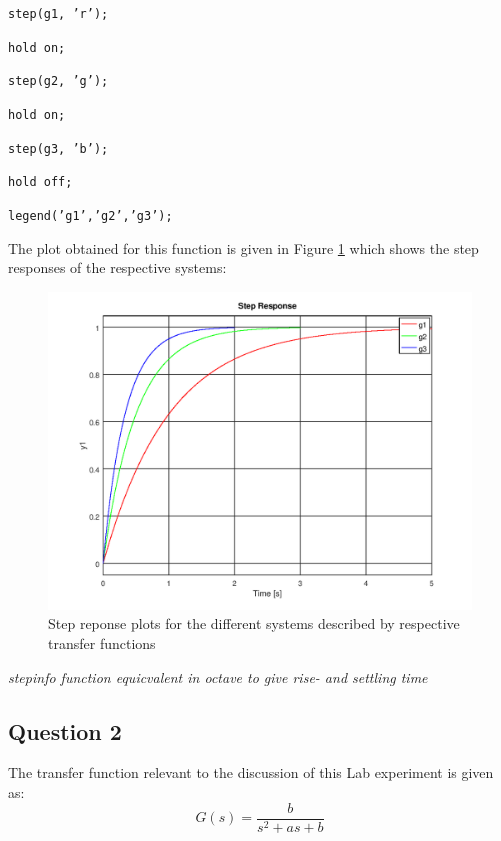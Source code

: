 \documentclass[a4paper, 12pt]{article}
\begin{document}
		\texttt{step(g1, 'r');}\par
		\texttt{hold on;}\par
		\texttt{step(g2, 'g');}\par
		\texttt{hold on;}\par
		\texttt{step(g3, 'b');}\par
		\texttt{hold off;}\par

		\texttt{legend('g1','g2','g3');}\par

		The plot obtained for this function is given in Figure \ref{fig:plot_question_1_lab} which shows the step responses of the respective systems:

		\begin{figure}[H]
			\centering
			\includegraphics[width = 150mm]{img/Question_1_Lab_Plots.png}
			\caption{Step reponse plots for the different systems described by respective transfer functions}
			\label{fig:plot_question_1_lab}
		\end{figure}

		\textit{stepinfo function equicvalent in octave to give rise- and settling time}

	\subsection{Question 2}
	\label{question_2_lab}
		The transfer function relevant to the discussion of this Lab experiment is given as:
		\begin{equation}
				G(s) = \frac{b}{s^2+as+b}	
		\end{equation}
\end{document}
